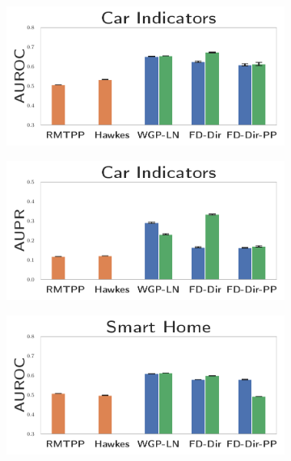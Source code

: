 \begin{figure}
\centering
    \begin{subfigure}{0.25\textwidth}
        \centering
        \includegraphics[width=\linewidth]{images/uncertainty-roc-bmw-indicator.pdf}
    \end{subfigure}%
    \begin{subfigure}{0.25\textwidth}
        \centering
        \includegraphics[width=\linewidth]{images/uncertainty-apr-bmw-indicator.pdf}
    \end{subfigure}%
        \begin{subfigure}{0.25\textwidth}
        \centering
        \includegraphics[width=\linewidth]{images/uncertainty-roc-kast-home.pdf}

\end{subfigure}
\end{figure}
